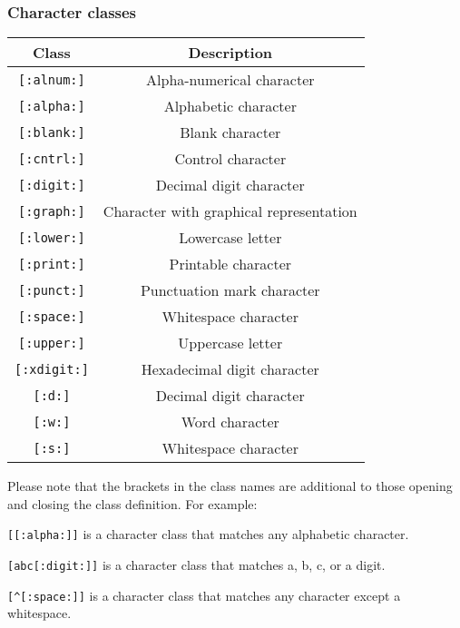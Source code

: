 \subsubsection{Character classes}
\begin{center}
	\begin{tabular}{|c|c|}
		\hline
		Class				&	Description							\\	
		\hline
		\verb![:alnum:]!	&	Alpha-numerical character			\\
		\hline
		\verb![:alpha:]!	&	Alphabetic character			\\
		\hline
		\verb![:blank:]!	&	Blank character				\\
		\hline
		\verb![:cntrl:]!	&	Control character		\\
		\hline
		\verb![:digit:]!	&	Decimal digit character					\\
		\hline
		\verb![:graph:]!	&	Character with graphical representation\\
		\hline
		\verb![:lower:]!	&	Lowercase letter	\\				
		\hline
		\verb![:print:]!	&	Printable character				\\
		\hline
		\verb![:punct:]!	&	Punctuation mark character	\\
		\hline
		\verb![:space:]!	&	Whitespace character	\\
		\hline
		\verb![:upper:]!	&	Uppercase letter	\\
		\hline
		\verb![:xdigit:]!	&	Hexadecimal digit character\\
		\hline
		\verb![:d:]!		&	Decimal digit character	\\
		\hline
		\verb![:w:]!		&	Word character		\\
		\hline
		\verb![:s:]!		&	Whitespace character\\
		\hline
	\end{tabular}
\end{center}
Please note that the brackets in the class names are additional to those opening and closing the class definition. For example:

\verb![[:alpha:]]! is a character class that matches any alphabetic character.

\verb![abc[:digit:]]! is a character class that matches a, b, c, or a digit.

\verb![^[:space:]]! is a character class that matches any character except a whitespace.

